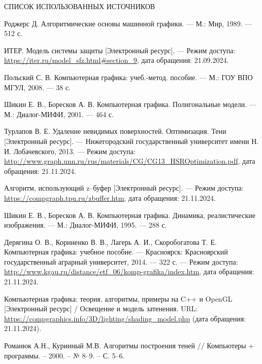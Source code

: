 \begin{center}
    \MakeUppercase{\large Список использованных источников}
\end{center}

\renewcommand{\refname}{}
\vspace{-11mm}

\makeatletter
\renewcommand\@biblabel[1]{#1.} %
\makeatother

\begin{thebibliography}{9} 
    Роджерс Д. Алгоритмические основы машинной графики. — М.: Мир, 1989. — 512 с.
    
    ИТЕР. Модель системы защиты [Электронный ресурс]. — Режим доступа: \url{https://iter.ru/model_sfz.html#section_9}, дата обращения: 21.09.2024.
    
    Польский С. В. Компьютерная графика: учеб.-метод. пособие. — М.: ГОУ ВПО МГУЛ, 2008. — 38 с.
    
    Шикин Е. В., Боресков А. В. Компьютерная графика. Полигональные модели. — М.: Диалог-МИФИ, 2001. — 464 с.
    
    Турлапов В. Е. Удаление невидимых поверхностей. Оптимизация. Тени [Электронный ресурс]. — Нижегородский государственный университет имени Н. И. Лобачевского, 2013. — Режим доступа: \url{http://www.graph.unn.ru/rus/materials/CG/CG13_HSROptimization.pdf}, дата обращения: 21.11.2024.
    
    Алгоритм, использующий z–буфер [Электронный ресурс]. — Режим доступа: \url{https://compgraph.tpu.ru/zbuffer.htm}, дата обращения: 21.11.2024.
    
    Шикин Е. В., Боресков А. В. Компьютерная графика. Динамика, реалистические изображения. — М.: Диалог-МИФИ, 1995. — 288 с.
    
    Дерягина О. В., Корниенко В. В., Лагерь А. И., Скоробогатова Т. Е. Компьютерная графика: учебное пособие. — Красноярск: Красноярский государственный аграрный университет, 2014. — 322 с. — Режим доступа: \url{http://www.kgau.ru/distance/etf_06/komp-grafika/index.htm}, дата обращения: 21.11.2024.
    
Компьютерная графика: теория, алгоритмы, примеры на C++ и OpenGL [Электронный ресурс] / Освещение и модель затенения. URL: \url{https://compgraphics.info/3D/lighting/shading_model.php} (дата обращения: 21.11.2024).

Романюк А.Н., Куринный М.В. 
Алгоритмы построения теней // Компьютеры + программы. – 2000. – № 8–9. – С. 5–6.
    
\end{thebibliography}

